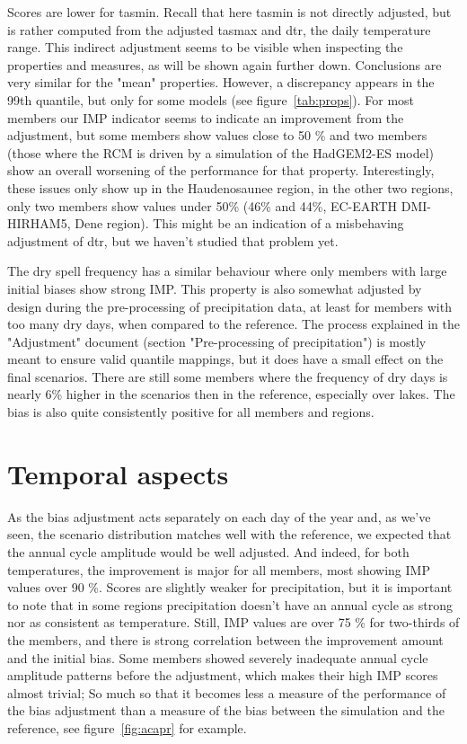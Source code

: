 \documentclass[letterpaper,10pt]{article}
\begin{document}
Scores are lower for tasmin. Recall that here tasmin is not directly adjusted, but is rather computed from the adjusted tasmax and dtr, the daily temperature range.
This indirect adjustment seems to be visible when inspecting the properties and measures, as will be shown again further down.
Conclusions are very similar for the "mean" properties.
However, a discrepancy appears in the 99th quantile, but only for some models (see figure~\ref{tab:props}).
For most members our IMP indicator seems to indicate an improvement from the adjustment, but some members show values close to 50 \% and two members (those where the RCM is driven by a simulation of the HadGEM2-ES model) show an overall worsening of the performance for that property.
Interestingly, these issues only show up in the Haudenosaunee region, in the other two regions, only two members show values under 50\% (46\% and 44\%, EC-EARTH DMI-HIRHAM5, Dene region).
This might be an indication of a misbehaving adjustment of dtr, but we haven't studied that problem yet.

The dry spell frequency has a similar behaviour where only members with large initial biases show strong IMP.
This property is also somewhat adjusted by design during the pre-processing of precipitation data, at least for members with too many dry days, when compared to the reference.
The process explained in the "Adjustment" document (section "Pre-processing of precipitation") is mostly meant to ensure valid quantile mappings, but it does have a small effect on the final scenarios.
There are still some members where the frequency of dry days is nearly 6\% higher in the scenarios then in the reference, especially over lakes.
The bias is also quite consistently positive for all members and regions.

\section{Temporal aspects}
As the bias adjustment acts separately on each day of the year and, as we've seen, the scenario distribution matches well with the reference, we expected that the annual cycle amplitude would be well adjusted.
And indeed, for both temperatures, the improvement is major for all members, most showing IMP values over 90 \%.
Scores are slightly weaker for precipitation, but it is important to note that in some regions precipitation doesn't have an annual cycle as strong nor as consistent as temperature.
Still, IMP values are over 75 \% for two-thirds of the members, and there is strong correlation between the improvement amount and the initial bias.
Some members showed severely inadequate annual cycle amplitude patterns before the adjustment, which makes their high IMP scores almost trivial;
So much so that it becomes less a measure of the performance of the bias adjustment than a measure of the bias between the simulation and the reference, see figure~\ref{fig:acapr} for example.
\end{document}
